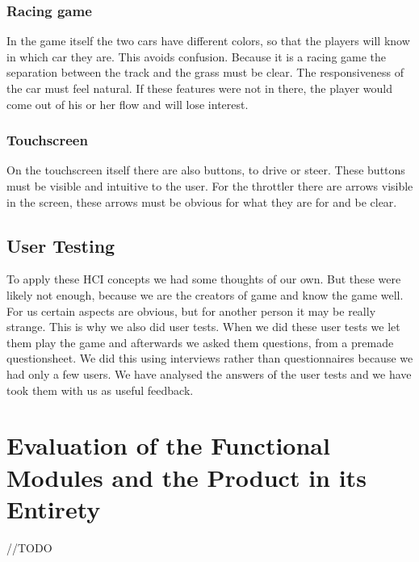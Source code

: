 \documentclass[11pt,twoside,a4paper]{article}
\begin{document}
\subsubsection{Racing game}
In the game itself the two cars have different colors, so that the players will know in which car they are. This avoids confusion. Because it is a racing game the separation between the track and the grass must be clear. The responsiveness of the car must feel natural. If these features were not in there, the player would come out of his or her flow and will lose interest.

\subsubsection{Touchscreen}
On the touchscreen itself there are also buttons, to drive or steer. These buttons must be visible and intuitive to the user. For the throttler there are arrows visible in the screen, these arrows must be obvious for what they are for and be clear.

\subsection{User Testing}
To apply these HCI concepts we had some thoughts of our own. But these were likely not enough, because we are the creators of game and know the game well. For us certain aspects are obvious, but for another person it may be really strange. This is why we also did user tests. When we did these user tests we let them play the game and afterwards we asked them questions, from a premade questionsheet. We did this using interviews rather than questionnaires because we had only a few users. We have analysed the answers of the user tests and we have took them with us as useful feedback.

\clearpage

\section{Evaluation of the Functional Modules and the Product in its Entirety}
//TODO
\end{document}
